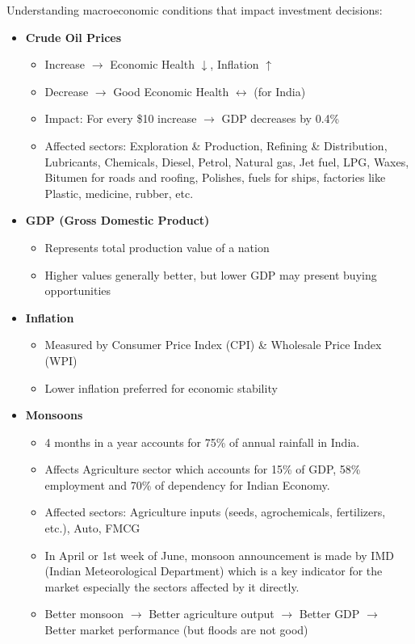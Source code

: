 \documentclass[12pt]{article}
\begin{document}
Understanding macroeconomic conditions that impact investment decisions:

\begin{itemize}
\item \textbf{Crude Oil Prices}
    \begin{itemize}
    \item Increase $\rightarrow$ Economic Health $\downarrow$, Inflation $\uparrow$
    \item Decrease $\rightarrow$ Good Economic Health $\leftrightarrow$ (for India)
    \item Impact: For every \$10 increase $\rightarrow$ GDP decreases by 0.4\%
    \item Affected sectors: Exploration \& Production, Refining \& Distribution, Lubricants, Chemicals, Diesel, Petrol, Natural gas, Jet fuel, LPG, Waxes, Bitumen for roads and roofing, Polishes, fuels for ships, factories like Plastic, medicine, rubber, etc.
    \end{itemize}

\item \textbf{GDP (Gross Domestic Product)}
    \begin{itemize}
    \item Represents total production value of a nation
    \item Higher values generally better, but lower GDP may present buying opportunities
    \end{itemize}

\item \textbf{Inflation}
    \begin{itemize}
    \item Measured by Consumer Price Index (CPI) \& Wholesale Price Index (WPI)
    \item Lower inflation preferred for economic stability
    \end{itemize}

\item \textbf{Monsoons}
    \begin{itemize}
    \item 4 months in a year accounts for 75\% of annual rainfall in India.
    \item Affects Agriculture sector which accounts for 15\% of GDP, 58\% employment and 70\% of dependency for Indian Economy.
    \item Affected sectors: Agriculture inputs (seeds, agrochemicals, fertilizers, etc.), Auto, FMCG
    \item In April or 1st week of June, monsoon announcement is made by IMD (Indian Meteorological Department) which is a key indicator for the market especially the sectors affected by it directly.
    \item Better monsoon $\rightarrow$ Better agriculture output $\rightarrow$ Better GDP $\rightarrow$ Better market performance (but floods are not good)
    \end{itemize}


\end{itemize}
\end{document}
